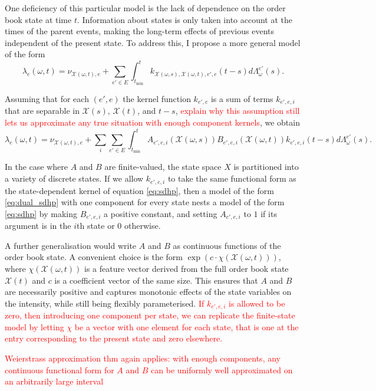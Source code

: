 \documentclass[honours,12pt]{unswthesis}
\numberwithin{equation}{section}
\begin{document}
One deficiency of this particular model is the lack of dependence on the order book state at time $t$. Information about states is only taken into account at the times of the parent events, making the long-term effects of previous events independent of the present state. To address this, I propose a more general model of the form
$$\lambda_e(\omega,t) = \nu_{\mathcal{X}(\omega,t),e} + \sum_{e'\in E}\int_{t_\mathrm{min}}^t k_{\mathcal{X}(\omega,s),\mathcal{X}(\omega,t),e',e}(t-s)d\Lambda_\omega^{e'}(s).$$

Assuming that for each $(e',e)$ the kernel function $k_{e',e}$ is a sum of terms $k_{e',e,i}$ that are separable in $\mathcal{X}(s)$, $\mathcal{X}(t)$, and $t-s$, \textcolor{red}{explain why this assumption still lets us approximate any true situation with enough component kernels}, we obtain
\begin{equation}
	\lambda_e(\omega,t) = \nu_{\mathcal{X}(\omega,t),e} + \sum_i \sum_{e'\in E}\int_{t_\mathrm{min}}^t A_{e',e,i}(\mathcal{X}(\omega,s))B_{e',e,i}(\mathcal{X}(\omega,t))k_{e',e,i}(t-s)d\Lambda_\omega^{e'}(s). \label{eq:dual_sdhp}
\end{equation}

In the case where $A$ and $B$ are finite-valued, the state space $X$ is partitioned into a variety of discrete states. If we allow $k_{e',e,i}$ to take the same functional form as the state-dependent kernel of equation \ref{eq:sdhp}, then a model of the form \ref{eq:dual_sdhp} with one component for every state nests a model of the form \ref{eq:sdhp} by making $B_{e',e,i}$ a positive constant, and setting $A_{e',e,i}$ to $1$ if its argument is in the $i$th state or $0$ otherwise.

A further generalisation would write $A$ and $B$ as continuous functions of the order book state. A convenient choice is the form $\exp(c\cdot \chi(\mathcal{X}(\omega,t)))$, where $\chi(\mathcal{X}(\omega,t))$ is a feature vector derived from the full order book state $\mathcal{X}(t)$ and $c$ is a coefficient vector of the same size. This ensures that $A$ and $B$ are necessarily positive and captures monotonic effects of the state variables on the intensity, while still being flexibly parameterised. \textcolor{red}{If $k_{e',e,i}$ is allowed to be zero, then introducing one component per state, we can replicate the finite-state model by letting $\chi$ be a vector with one element for each state, that is one at the entry corresponding to the present state and zero elsewhere.}

\textcolor{red}{Weierstrass approximation thm again applies: with enough components, any continuous functional form for $A$ and $B$ can be uniformly well approximated on an arbitrarily large interval}
\end{document}
